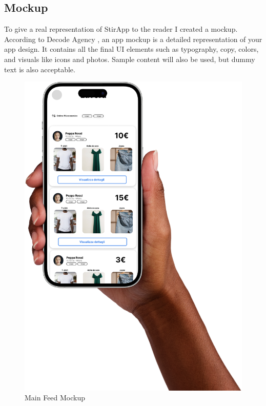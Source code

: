 \subsection{Mockup}
To give a real representation of StirApp to the reader I created a mockup. According to Decode Agency \cite{decodeagency}, an app mockup is a detailed representation of your app design. It contains all the final UI elements such as typography, copy, colors, and visuals like icons and photos. Sample content will also be used, but dummy text is also acceptable.
\begin{figure}[hbtp]
\caption{Main Feed Mockup}
\centering
\includegraphics[scale=0.2]{../Images/mockup02.png}
\end{figure}

